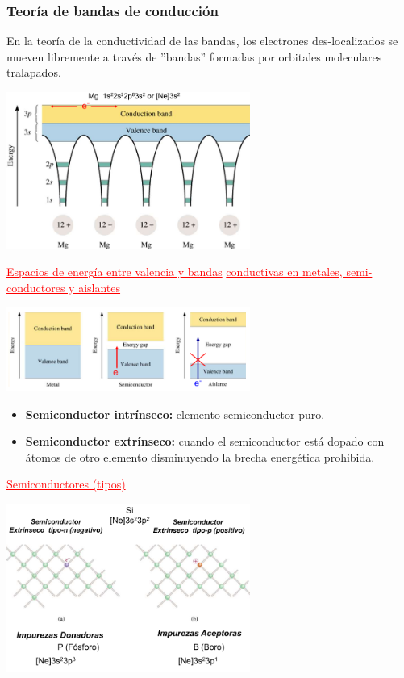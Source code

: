         \subsubsection{Teoría de bandas de conducción}
            \sangria{} En la teoría de la conductividad de las bandas, los electrones des-localizados se mueven libremente a través de ''bandas'' formadas por orbitales moleculares tralapados.
            \begin{center} \includegraphics[width=8cm]{./imagenes/bandasDeConduccionMg.png} \end{center}
        \begin{center} \textcolor{red}{\underline{Espacios de energía entre valencia y bandas} \underline{conductivas en metales, semi-conductores y aislantes}} \end{center}
        \begin{center} \includegraphics[width=8cm]{./imagenes/espaciosEnergiaValenciaYBandasConductivasMetales.png} \end{center}
        \begin{itemize}
            \item \textbf{Semiconductor intrínseco:} elemento semiconductor puro.
            \item \textbf{Semiconductor extrínseco:} cuando el semiconductor está dopado con átomos de otro elemento disminuyendo la brecha energética prohibida.
        \end{itemize}
        \begin{center} \textcolor{red}{\underline{Semiconductores (tipos)}} \end{center}
        \begin{center} \includegraphics[width=8cm]{./imagenes/tiposSemiconductores.png} \end{center}
